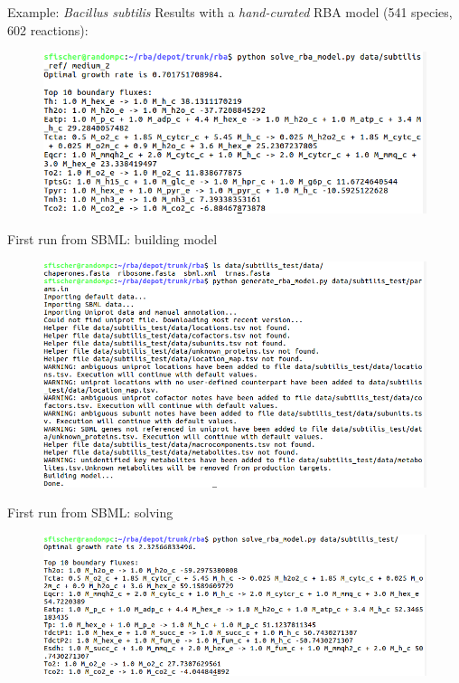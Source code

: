 \documentclass{beamer}
\begin{document}
\begin{frame}{Example: \textit{Bacillus subtilis}}
  Results with a \emph{hand-curated} RBA model (541 species, 602 reactions):
  \begin{figure}
    \centering
    \includegraphics[width=\linewidth]{subtilis_ref}
  \end{figure}
\end{frame}

\begin{frame}{First run from SBML: building model}
  \begin{figure}
    \centering
    \includegraphics[width=\linewidth]{first_run}
  \end{figure}
\end{frame}

\begin{frame}{First run from SBML: solving}
  \begin{figure}
    \centering
    \includegraphics[width=\linewidth]{first_run_solver}
  \end{figure}
\end{frame}
\end{document}
